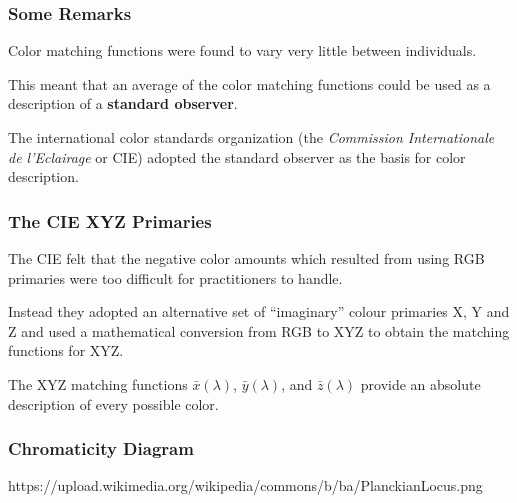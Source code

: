 \documentclass[12pt]{beamer}\usepackage[]{graphicx}\usepackage[]{color}
\begin{document}

\begin{frame}
\frametitle{Some Remarks}

\bbi
  \item Color matching functions were found to vary very little between 
  individuals.
  \item This meant that an average of the color matching functions could be
  used as a description of a \textbf{standard observer}.
  \item The international color standards organization (the 
  \textit{Commission Internationale de l'Eclairage} or CIE) adopted the
  standard observer as the basis for color description.
\ei

\end{frame}


\begin{frame}
\frametitle{The CIE XYZ Primaries}

\bbi
  \item The CIE felt that the negative color amounts which resulted from using 
  RGB primaries were too difficult for practitioners to handle.
  \item Instead they adopted an alternative set of ``imaginary'' colour 
  primaries X, Y and Z and used a mathematical conversion from RGB to XYZ to 
  obtain the matching functions for XYZ.
  \item The XYZ matching functions $\bar{x}(\lambda)$, $\bar{y}(\lambda)$,
  and $\bar{z}(\lambda)$ provide an absolute description of every possible color.
\ei

\end{frame}


\begin{frame}
\begin{center}
\Huge{}
\end{center}
\end{frame}


\begin{frame}
\frametitle{Chromaticity Diagram}
\begin{center}

{\scriptsize {\lolit https://upload.wikimedia.org/wikipedia/commons/b/ba/PlanckianLocus.png}}
\end{center}
\end{frame}
\end{document}
